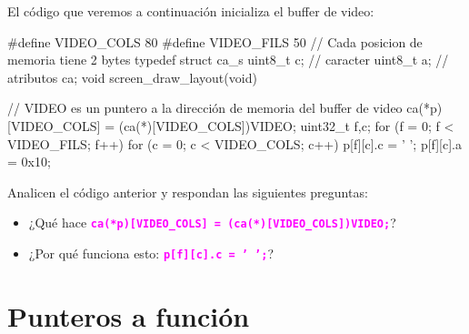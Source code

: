 \documentclass[]{scrartcl}
\newcommand{\hl}[1]{\textcolor{magenta}{\textbf{\texttt{#1}}}}
\begin{document}
El código que veremos a continuación inicializa el buffer de video:

\begin{cbox}[]{}
  #define VIDEO_COLS 80
  #define VIDEO_FILS 50
  // Cada posicion de memoria tiene 2 bytes
  typedef struct ca_s {
    uint8_t c; // caracter
    uint8_t a; // atributos
  } ca;
  void screen_draw_layout(void) {

    // VIDEO es un puntero a la dirección de memoria del buffer de video
    ca(*p)[VIDEO_COLS] = (ca(*)[VIDEO_COLS])VIDEO;
    uint32_t f,c;
    for (f = 0; f <  VIDEO_FILS; f++) {
      for (c = 0; c < VIDEO_COLS; c++) {
        p[f][c].c = ' ';
        p[f][c].a = 0x10;
      }
    }
  }
\end{cbox}

\begin{exbox}
  Analicen el código anterior y respondan las siguientes preguntas:
  \begin{itemize}
    \item ¿Qué hace \hl{ca(*p)[VIDEO\_COLS] = (ca(*)[VIDEO\_COLS])VIDEO;}?
    \item ¿Por qué funciona esto: \hl{p[f][c].c = ' ';}?
  \end{itemize}
\end{exbox}


\section*{Punteros a función}
\end{document}
